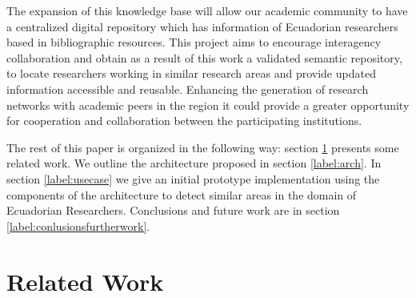 \documentclass[11pt]{article}
\begin{document}
The expansion of this knowledge base will allow %
our academic community to have a centralized digital repository which has information of Ecuadorian researchers based in bibliographic resources. This project aims to encourage interagency collaboration and obtain as a result of this work a validated semantic repository, to locate researchers working in similar research areas and provide updated information accessible and reusable. Enhancing the generation of research networks with academic peers in the region it could provide a greater opportunity for cooperation and collaboration between the participating institutions.

The rest of this paper is organized in the following way: section \ref{label:relatedwork} presents some related work. We outline the architecture proposed in section \ref{label:arch}. In section \ref{label:usecase} we give an initial prototype implementation using the components of the architecture to detect similar areas in the domain of Ecuadorian Researchers. %
Conclusions and future work are in section \ref{label:conlusionsfurtherwork}.

\section{Related Work}
\label{label:relatedwork}

\end{document}
